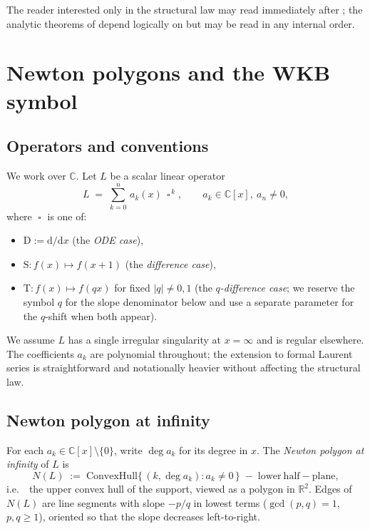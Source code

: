 \documentclass[11pt,a4paper]{article}
\theoremstyle{plain}
\theoremstyle{definition}
\theoremstyle{remark}
\newcommand{\op}{\mathop{\square}}                %
\newcommand{\opD}{\mathrm{D}}                     %
\newcommand{\opS}{\mathrm{S}}                     %
\newcommand{\opT}{\mathrm{T}}                     %
\newcommand{\NL}{N(L)}
\newcommand{\ie}{i.e.\ }
\begin{document}
\bigskip
The reader interested only in the structural law may read
 immediately after ; the analytic
theorems of  depend logically on
 but may be read in any internal order.



\section{Newton polygons and the WKB symbol}\label{sec:prelim}

\subsection{Operators and conventions}\label{ssec:prelim-ops}

We work over $\mathbb{C}$. Let $L$ be a scalar linear operator
\[
   L \;=\; \sum_{k=0}^{n}\, a_k(x)\, \op^{\,k},
   \qquad a_k \in \mathbb{C}[x],\ a_n \ne 0,
\]
where $\op$ is one of:
\begin{itemize}[leftmargin=2em]
\item $\opD := \mathrm{d}/\mathrm{d}x$ \quad (the \emph{ODE case}),
\item $\opS \colon f(x) \mapsto f(x+1)$ \quad (the \emph{difference case}),
\item $\opT \colon f(x) \mapsto f(qx)$ for fixed $|q| \ne 0, 1$ \quad
      (the \emph{$q$-difference case}; we reserve the symbol $q$ for the
      slope denominator below and use a separate parameter for the
      $q$-shift when both appear).
\end{itemize}
We assume $L$ has a single irregular singularity at $x = \infty$ and is
regular elsewhere. The coefficients $a_k$ are polynomial throughout; the
extension to formal Laurent series is straightforward and notationally
heavier without affecting the structural law.

\subsection{Newton polygon at infinity}\label{ssec:prelim-Newton}

For each $a_k \in \mathbb{C}[x] \setminus \{0\}$, write $\deg a_k$ for its
degree in $x$. The \emph{Newton polygon at infinity} of $L$ is
\[
   \NL \;:=\;
   \mathrm{ConvexHull}\big\{\,(k, \deg a_k) : a_k \ne 0\,\big\}
   \;-\; \mathrm{lower\ half\!-plane},
\]
\ie\ the upper convex hull of the support, viewed as a polygon in
$\mathbb{R}^2$. Edges of $\NL$ are line segments with slope $-p/q$ in
lowest terms ($\gcd(p, q) = 1$, $p, q \ge 1$), oriented so that the slope
decreases left-to-right.
\end{document}
